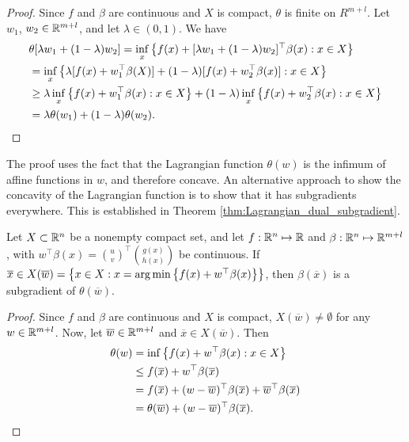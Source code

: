 \begin{proof}
Since $f$ and $\beta$ are continuous and $X$ is compact, $\theta$ is finite on $R^{m+l}$. Let $w_1$, $w_2 \in \mathbb{R}^{m+l}$, and let $\lambda \in (0,1)$. We have
\begin{align*}
&\theta[\lambda w_1 + (1 - \lambda)w_2] = \inf_x\left\{ f(x) + [\lambda w_1 + (1 - \lambda)w_2]^\top \beta(x) : x \in X \right \}\\
& = \inf_x\left\{ \lambda[f(x) + w_1^\top\beta(X)] + (1-\lambda)[f(x) + w_2^\top \beta(x)] : x \in X \right \} \\
& \geq \lambda \inf_x\left\{ f(x) + w_1^\top \beta(x) : x \in X \right \} + (1 - \lambda)\inf_x\left\{ f(x) + w_2^\top \beta(x) : x \in X \right \} \\
&= \lambda \theta(w_1) + (1 - \lambda) \theta(w_2). \qedhere
\end{align*}
\end{proof}

The proof uses the fact that the Lagrangian function $\theta(w)$ is the infimum of affine functions in $w$, and therefore concave. An alternative approach to show the concavity of the Lagrangian function is to show that it has subgradients everywhere. This is established in Theorem \ref{thm:Lagrangian_dual_subgradient}. 

\begin{theorem} \label{thm:Lagrangian_dual_subgradient}
Let $X \subset \mathbb{R}^n$ be a nonempty compact set, and let $f: \mathbb{R}^n \mapsto \mathbb{R}$ and $\beta : \mathbb{R}^{n} \mapsto \mathbb{R}^{m+l}$, with $w^\top\beta(x) = \binom{u}{v}^\top \binom{g(x)}{h(x)}$ be continuous. If $\overline{x} \in X(\overline{w}) = \left\{ x \in X : x = \arg \min \left\{ f(x) + w^\top\beta(x) \right \} \right \}$, then $\beta(\overline{x})$ is a subgradient of $\theta(\overline{w})$.
\end{theorem}
%
\begin{proof}
Since $f$ and $\beta$ are continuous and $X$ is compact, $X(\overline{w}) \neq \emptyset$ for any $w \in \mathbb{R}^{m+l}$. Now, let $\overline{w} \in \mathbb{R}^{m+l}$ and $\overline{x} \in X(\overline{w})$. Then
\begin{align*}
\theta(w)& = \inf\left\{ f(x) + w^\top\beta(x) : x \in X \right \} \\ & \leq f(\overline{x}) + w^\top\beta(\overline{x}) \\ 
& = f(\overline{x}) + (w - \overline{w})^\top\beta(\overline{x}) + \overline{w}^\top \beta(\overline{x}) \\
& = \theta(\overline{w}) + (w - \overline{w})^\top \beta(\overline{x}). \qedhere
\end{align*}
\end{proof}


